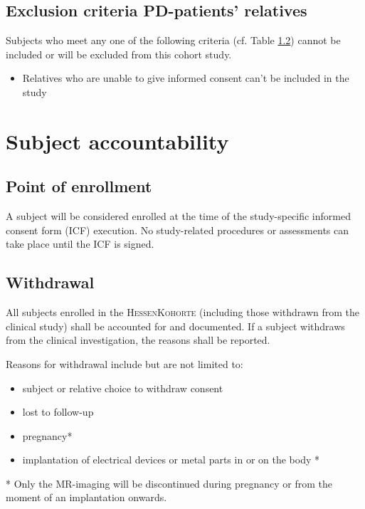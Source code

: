 \subsection{Exclusion criteria \ac{PD}-patients' relatives}
\label{sec:exclusion_criteriaREL}
Subjects who meet any one of the following criteria (cf. Table \ref{}) cannot be included or will be excluded from this cohort study.
\begin{itemize}
  \item  Relatives who are unable to give informed consent can't be included in the study
\end{itemize}


\section{Subject accountability}

\subsection{Point of enrollment}
A subject will be considered enrolled at the time of the study-specific informed consent form (ICF) execution. No study-related procedures or assessments can take place until the ICF is signed.

\subsection{Withdrawal}
All subjects enrolled in the \textsc{HessenKohorte} (including those withdrawn from the clinical study) shall be accounted for and documented. If a subject withdraws from the clinical investigation, the reasons shall be reported.

Reasons for withdrawal include but are not limited to:
\begin{itemize}
  \item subject or relative choice to withdraw consent
  \item lost to follow-up
  \item pregnancy*
  \item implantation of electrical devices or metal parts in or on the body *
\end{itemize}

* Only the MR-imaging will be discontinued during pregnancy or from the moment of an implantation onwards.

